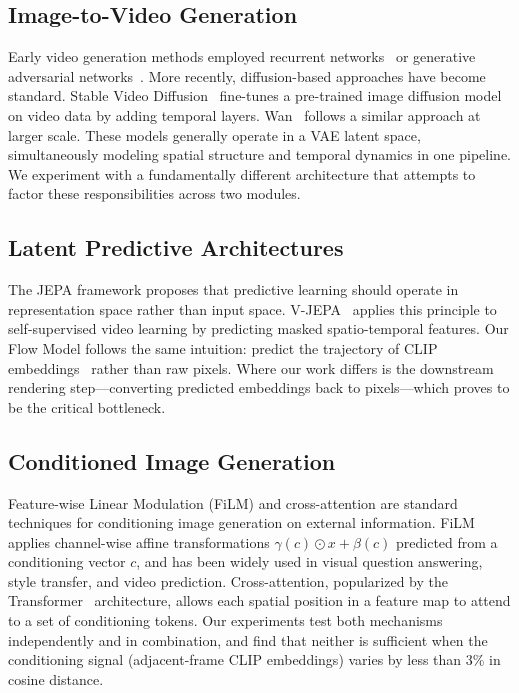 \documentclass[10pt,twocolumn,letterpaper]{article}
\begin{document}
\subsection{Image-to-Video Generation}
Early video generation methods employed recurrent
networks~\cite{srivastava2015} or generative adversarial
networks~\cite{vondrick2016}. More recently, diffusion-based approaches have
become standard. Stable Video Diffusion~\cite{blat2023} fine-tunes a
pre-trained image diffusion model on video data by adding temporal layers.
Wan~\cite{wan2025} follows a similar approach at larger scale. These models generally operate in a VAE latent
space, simultaneously modeling spatial structure and temporal dynamics in one
pipeline. We experiment with a fundamentally different architecture that
attempts to factor these responsibilities across two modules.

\subsection{Latent Predictive Architectures}
The JEPA framework proposes that predictive learning should operate in
representation space rather than input space. V-JEPA~\cite{bardes2024} applies this
principle to self-supervised video learning by predicting masked
spatio-temporal features. Our Flow Model follows the same intuition: predict
the trajectory of CLIP embeddings~\cite{radford2021} rather than raw pixels. Where our work
differs is the downstream rendering step---converting predicted embeddings
back to pixels---which proves to be the critical bottleneck.

\subsection{Conditioned Image Generation}
Feature-wise Linear Modulation (FiLM) and cross-attention are
standard techniques for conditioning image generation on external
information. FiLM~\cite{perez2018} applies channel-wise affine transformations
$\gamma(c) \odot x + \beta(c)$ predicted from a conditioning vector $c$,
and has been widely used in visual question answering, style transfer, and
video prediction. Cross-attention, popularized by the
Transformer~\cite{vaswani2017} architecture, allows each spatial position in a feature map to attend to a
set of conditioning tokens. Our experiments test both mechanisms
independently and in combination, and find that neither is sufficient when
the conditioning signal (adjacent-frame CLIP embeddings) varies by less
than 3\% in cosine distance.
\end{document}
